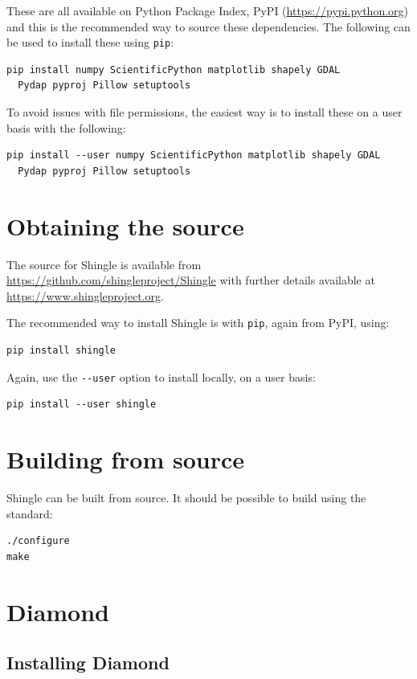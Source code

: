 \documentclass[a4paper, 10pt]{book}
\providecommand{\shingle}{Shingle\xspace}
\begin{document}
\noindent
These are all available on Python Package Index, PyPI
(\url{https://pypi.python.org})
and this is the recommended way to source these dependencies.
The following can be used to install these using \verb+pip+:
\begin{verbatim}
pip install numpy ScientificPython matplotlib shapely GDAL
  Pydap pyproj Pillow setuptools
\end{verbatim}

\noindent
To avoid issues with file permissions, the easiest way is to install these on a user basis with the following:
\begin{verbatim}
pip install --user numpy ScientificPython matplotlib shapely GDAL
  Pydap pyproj Pillow setuptools
\end{verbatim}

\section{Obtaining the source}

\noindent
The source for \shingle is available from
\url{https://github.com/shingleproject/Shingle}
with further details available at
\url{https://www.shingleproject.org}.

\noindent
The recommended way to install \shingle is with \verb+pip+, again from PyPI, using:
\begin{verbatim}
pip install shingle 
\end{verbatim}

\noindent
Again, use the \verb+--user+ option to install locally, on a user basis:
\begin{verbatim}
pip install --user shingle 
\end{verbatim}

\section{Building from source}

\shingle can be built from source.  It should be possible to build using the standard:
\begin{verbatim}
./configure
make
\end{verbatim}

\section{Diamond}

\subsection{Installing Diamond}
\end{document}
